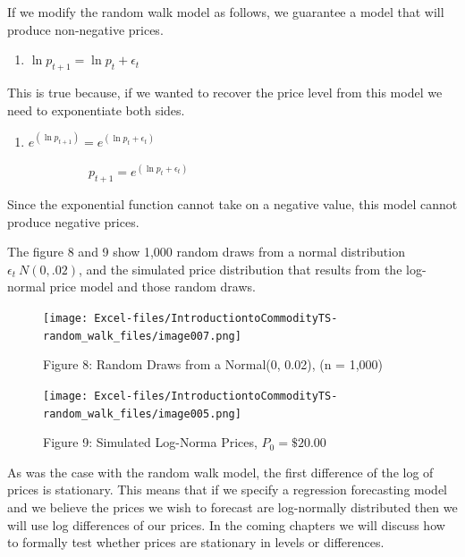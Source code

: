 \documentclass[
  letterpaper,
  DIV=11,
  numbers=noendperiod]{scrreprt}
\providecommand{\tightlist}{%
  \setlength{\itemsep}{0pt}\setlength{\parskip}{0pt}}\usepackage{longtable,booktabs,array}
\begin{document}
If we modify the random walk model as follows, we guarantee a model that
will produce non-negative prices.

\begin{enumerate}
\def\labelenumi{(\arabic{enumi})}
\setcounter{enumi}{4}
\tightlist
\item
  \(\ln{p_{t+1}} = \ln{p_{t}} + \epsilon_t\)
\end{enumerate}

This is true because, if we wanted to recover the price level from this
model we need to exponentiate both sides.

\begin{enumerate}
\def\labelenumi{(\arabic{enumi})}
\setcounter{enumi}{5}
\tightlist
\item
  \(e^{(\ln{p_{t+1}})} = e^{(\ln{p_{t}} + \epsilon_t)}\)
\end{enumerate}

~~~~~~~~~~~~~\(p_{t+1} = e^{(\ln{p_{t}} + \epsilon_t)}\)

Since the exponential function cannot take on a negative value, this
model cannot produce negative prices.

The figure 8 and 9 show 1,000 random draws from a normal distribution
\(\epsilon_t ~ N(0, .02)\), and the simulated price distribution that
results from the log-normal price model and those random draws.

\begin{figure}[H]

{\centering \texttt{[image: Excel-files/IntroductiontoCommodityTS-random\_walk\_files/image007.png]}

}

\caption{Figure 8: Random Draws from a Normal(0, 0.02), (n = 1,000)}

\end{figure}%
\begin{figure}[H]

{\centering \texttt{[image: Excel-files/IntroductiontoCommodityTS-random\_walk\_files/image005.png]}

}

\caption{Figure 9: Simulated Log-Norma Prices, \(P_0 = \$20.00\)}

\end{figure}%

As was the case with the random walk model, the first difference of the
log of prices is stationary. This means that if we specify a regression
forecasting model and we believe the prices we wish to forecast are
log-normally distributed then we will use log differences of our prices.
In the coming chapters we will discuss how to formally test whether
prices are stationary in levels or differences.
\end{document}
